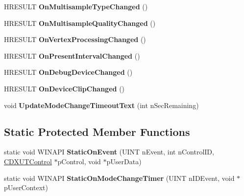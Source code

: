 \begin{DoxyCompactItemize}
\item 
\hypertarget{class_c_d3_d_settings_dlg_a5979860f92903f58815328188bb2255f}{H\+R\+E\+S\+U\+L\+T {\bfseries On\+Multisample\+Type\+Changed} ()}\label{class_c_d3_d_settings_dlg_a5979860f92903f58815328188bb2255f}

\item 
\hypertarget{class_c_d3_d_settings_dlg_ad4f5ee2ea8bc3d590fb7748987af28e6}{H\+R\+E\+S\+U\+L\+T {\bfseries On\+Multisample\+Quality\+Changed} ()}\label{class_c_d3_d_settings_dlg_ad4f5ee2ea8bc3d590fb7748987af28e6}

\item 
\hypertarget{class_c_d3_d_settings_dlg_a3462ae5f6053ed30ce6ce269ca155c82}{H\+R\+E\+S\+U\+L\+T {\bfseries On\+Vertex\+Processing\+Changed} ()}\label{class_c_d3_d_settings_dlg_a3462ae5f6053ed30ce6ce269ca155c82}

\item 
\hypertarget{class_c_d3_d_settings_dlg_a4ebbdfd84ac6ddf9cfaa0aba72b49681}{H\+R\+E\+S\+U\+L\+T {\bfseries On\+Present\+Interval\+Changed} ()}\label{class_c_d3_d_settings_dlg_a4ebbdfd84ac6ddf9cfaa0aba72b49681}

\item 
\hypertarget{class_c_d3_d_settings_dlg_a9d91dde47d69b3015e6670ef9df2651f}{H\+R\+E\+S\+U\+L\+T {\bfseries On\+Debug\+Device\+Changed} ()}\label{class_c_d3_d_settings_dlg_a9d91dde47d69b3015e6670ef9df2651f}

\item 
\hypertarget{class_c_d3_d_settings_dlg_a56d8e003ce194520995c88c531349f01}{H\+R\+E\+S\+U\+L\+T {\bfseries On\+Device\+Clip\+Changed} ()}\label{class_c_d3_d_settings_dlg_a56d8e003ce194520995c88c531349f01}

\item 
\hypertarget{class_c_d3_d_settings_dlg_a3f39877a682a4bf6ce639da830c8cbf9}{void {\bfseries Update\+Mode\+Change\+Timeout\+Text} (int n\+Sec\+Remaining)}\label{class_c_d3_d_settings_dlg_a3f39877a682a4bf6ce639da830c8cbf9}

\end{DoxyCompactItemize}
\subsection*{Static Protected Member Functions}
\begin{DoxyCompactItemize}
\item 
\hypertarget{class_c_d3_d_settings_dlg_a55cc59820bc86efb9819739110f9190f}{static void W\+I\+N\+A\+P\+I {\bfseries Static\+On\+Event} (U\+I\+N\+T n\+Event, int n\+Control\+I\+D, \hyperlink{class_c_d_x_u_t_control}{C\+D\+X\+U\+T\+Control} $\ast$p\+Control, void $\ast$p\+User\+Data)}\label{class_c_d3_d_settings_dlg_a55cc59820bc86efb9819739110f9190f}

\item 
\hypertarget{class_c_d3_d_settings_dlg_ac11b654fe4271f2876e5b52a9eaa154d}{static void W\+I\+N\+A\+P\+I {\bfseries Static\+On\+Mode\+Change\+Timer} (U\+I\+N\+T n\+I\+D\+Event, void $\ast$p\+User\+Context)}\label{class_c_d3_d_settings_dlg_ac11b654fe4271f2876e5b52a9eaa154d}

\end{DoxyCompactItemize}
